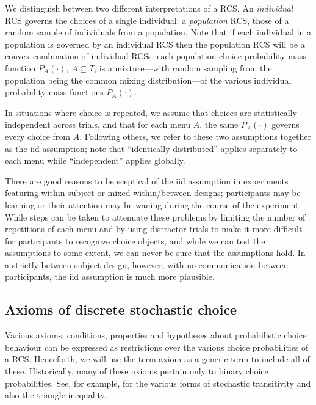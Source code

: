 \documentclass[11pt,letter]{article}
\newcommand{\menu}{menu}
\begin{document}
We distinguish between two different interpretations of a RCS.
An {\em individual} RCS governs the choices of a single individual; a {\em population} RCS, those of a random sample of individuals from a population.
Note that if each individual in a population is governed by an individual RCS then the population RCS will be a convex combination of individual RCSs: each population choice probability mass function $P_A(\cdot)$, $A \subseteq T$, is a mixture---with random sampling from the population being the common mixing distribution---of the various individual probability mass functions $P_A(\cdot)$.

In situations where choice is repeated, we assume that choices are statistically independent across trials, and that for each \menu{} $A$, the same $P_A(\cdot)$ governs every choice from $A$.
Following others, we refer to these two assumptions together as the iid assumption; note that ``identically distributed'' applies separately to each \menu{} while ``independent'' applies globally.

There are good reasons to be sceptical of the iid assumption in experiments featuring within-subject or mixed within/between designs; participants may be learning or their attention may be waning during the course of the experiment.
While steps can be taken to attenuate these problems by limiting the number of repetitions of each \menu{} and by using distractor trials to make it more difficult for participants to recognize choice objects, and while we can test the assumptions to some extent, we can never be sure that the assumptions hold.
In a strictly between-subject design, however, with no communication between participants, the iid assumption is much more plausible.

\subsection{Axioms of discrete stochastic choice}

Various axioms, conditions, properties and hypotheses about probabilistic choice behaviour can be expressed as restrictions over the various choice probabilities of a RCS.
Henceforth, we will use the term axiom as a generic term to include all of these.
Historically, many of these axioms pertain only to binary choice probabilities.
See, for example,  for the various forms of stochastic transitivity and also the triangle inequality.
\end{document}
